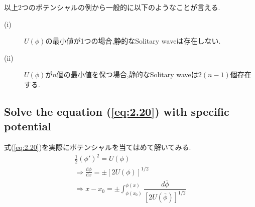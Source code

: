 \documentclass[dvipdfmx,11pt,a4paper]{jsbook}
\begin{document}
以上2つのポテンシャルの例から一般的に以下のようなことが言える.
\begin{screen}
    \begin{description}
        \item[(i)] $U(\phi)$の最小値が1つの場合,静的なSolitary waveは存在しない.
        \item[(ii)] $U(\phi)$が$n$個の最小値を保つ場合,静的なSolitary waveは$2(n-1)$個存在する.
    \end{description}
\end{screen}

\subsection{Solve the equation (\ref{eq:2.20}) with specific potential}
式(\ref{eq:2.20})を実際にポテンシャルを当てはめて解いてみる.
\begin{align}
    \frac{1}{2}(\phi')^2=U(\phi)\nonumber                                                        \\
    \Rightarrow \frac{\mathrm{d}\phi}{\mathrm{d}x}=\pm\left[2U(\phi)\right]^{1/2}\label{eq:2.22} \\
    \Rightarrow x-x_0=\pm\int_{\phi(x_0)}^{\phi(x)}\dfrac{d\bar{\phi}}{[2U(\bar{\phi})]^{1/2}}\label{eq:2.23}
\end{align}
\end{document}
